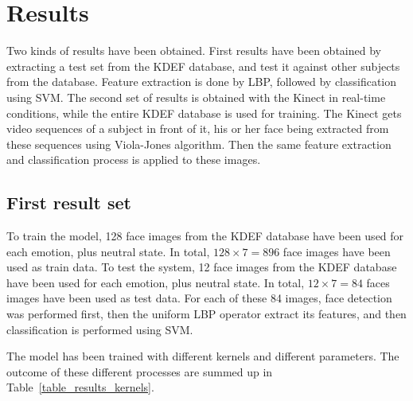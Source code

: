 \chapter{Results}
\label{chap:eval_results}

\noindent Two kinds of results have been obtained. First results have been obtained by extracting a test set from the KDEF database, and test it against other subjects from the database. Feature extraction is done by LBP, followed by classification using SVM. The second set of results is obtained with the Kinect in real-time conditions, while the entire KDEF database is used for training. The Kinect gets video sequences of a subject in front of it, his or her face being extracted from these sequences using Viola-Jones algorithm. Then the same feature extraction and classification process is applied to these images.
\newline

\section{First result set}

\vspace{\baselineskip}
\noindent To train the model, 128 face images from the KDEF database have been used for each emotion, plus neutral state. In total, $ 128\times7 = 896 $ face images have been used as train data. To test the system, 12 face images from the KDEF database have been used for each emotion, plus neutral state. In total, $ 12\times7 = 84 $ faces images have been used as test data. For each of these 84 images, face detection was performed first, then the uniform LBP operator extract its features, and then classification is performed using SVM.
\newline

\noindent The model has been trained with different kernels and different parameters. The outcome of these different processes are summed up in Table~\ref{table_results_kernels}.
\newline

